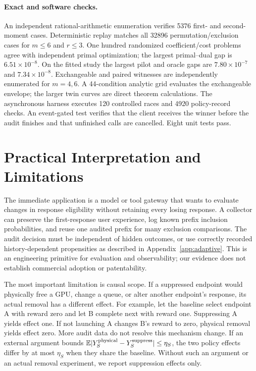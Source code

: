 \documentclass[12pt]{clear2027}
\newcommand{\E}{\mathbb{E}}
\begin{document}
\paragraph{Exact and software checks.}
An independent rational-arithmetic enumeration verifies 5376 first- and second-moment cases. Deterministic replay matches all 32896 permutation/exclusion cases for $m\le6$ and $r\le3$. One hundred randomized coefficient/cost problems agree with independent primal optimization; the largest primal--dual gap is $6.51\times10^{-8}$. On the fitted study the largest pilot and oracle gaps are $7.80\times10^{-7}$ and $7.34\times10^{-8}$. Exchangeable and paired witnesses are independently enumerated for $m=4,6$. A 44-condition analytic grid evaluates the exchangeable envelope; the larger twin curves are direct theorem calculations. The asynchronous harness executes 120 controlled races and 4920 policy-record checks. An event-gated test verifies that the client receives the winner before the audit finishes and that unfinished calls are cancelled. Eight unit tests pass.

\section{Practical Interpretation and Limitations}
The immediate application is a model or tool gateway that wants to evaluate changes in response eligibility without retaining every losing response. A collector can preserve the first-response user experience, log known prefix inclusion probabilities, and reuse one audited prefix for many exclusion comparisons. The audit decision must be independent of hidden outcomes, or use correctly recorded history-dependent propensities as described in Appendix~\ref{app:adaptive}. This is an engineering primitive for evaluation and observability; our evidence does not establish commercial adoption or patentability.

The most important limitation is causal scope. If a suppressed endpoint would physically free a GPU, change a queue, or alter another endpoint's response, its actual removal has a different effect. For example, let the baseline select endpoint A with reward zero and let B complete next with reward one. Suppressing A yields effect one. If not launching A changes B's reward to zero, physical removal yields effect zero. More audit data do not resolve this mechanism change. If an external argument bounds $\E|Y^{\rm physical}_S-Y^{\rm suppress}_S|\le\eta_S$, the two policy effects differ by at most $\eta_S$ when they share the baseline. Without such an argument or an actual removal experiment, we report suppression effects only.
\end{document}
